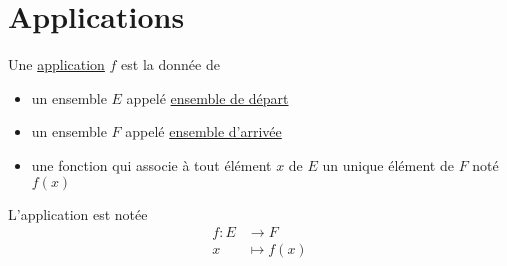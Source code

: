 \part{Applications}

\begin{defn}
	Une \underline{application} $f$ est la donnée de
	\begin{itemize}
		\item un ensemble $E$ appelé \underline{ensemble de départ}
		\item un ensemble $F$ appelé \underline{ensemble d'arrivée}
		\item une fonction qui associe à tout élément $x$ de $E$ un unique élément de $F$ noté $f(x)$
	\end{itemize}
	L'application est notée \begin{align*}
		f: E &\longrightarrow F \\
		x &\longmapsto f(x)
	\end{align*}
\end{defn}

